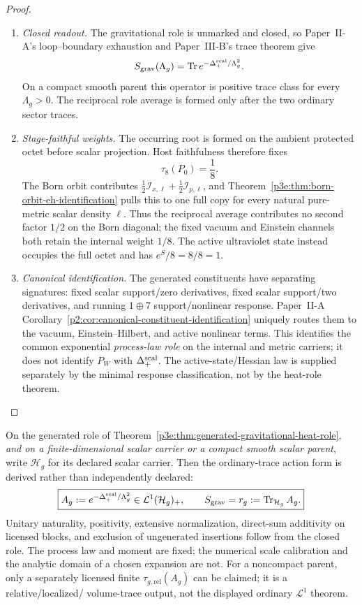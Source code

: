 \documentclass[12pt,a4paper]{article}
\begin{document}
\begin{proof}
\begin{enumerate}[label=\arabic*.,leftmargin=2.2em]
\item \emph{Closed readout.}
The gravitational role is unmarked and closed, so Paper~II-A's
loop--boundary exhaustion and Paper~III-B's trace theorem give
\[
 S_{\rm grav}(\Lambda_g)
 =\operatorname{Tr}e^{-\Delta_+^{\rm scal}/\Lambda_g^2}.
\]
On a compact smooth parent this operator is positive trace class for every
\(\Lambda_g>0\).  The reciprocal role average is formed only after the two
ordinary sector traces.

\item \emph{Stage-faithful weights.}
The occurring root is formed on the ambient protected octet before scalar
projection.  Host faithfulness therefore fixes
\[
 \tau_8(P_0)=\frac18.
\]
The Born orbit contributes
\(\tfrac12\mathcal I_{x,\ell}+\tfrac12\mathcal I_{p,\ell}\), and
Theorem~\ref{p3e:thm:born-orbit-eh-identification} pulls this to one full
copy for every natural pure-metric scalar density \(\ell\).  Thus the
reciprocal average contributes no second factor \(1/2\) on the Born diagonal;
the fixed vacuum and Einstein channels both retain the internal weight
\(1/8\).  The active ultraviolet state instead occupies the full octet and
has \(e^{S}/8=8/8=1\).

\item \emph{Canonical identification.}
The generated constituents have separating signatures:
fixed scalar support/zero derivatives, fixed scalar support/two derivatives,
and running \(1\oplus7\) support/nonlinear response.  Paper~II-A
Corollary~\ref{p2:cor:canonical-constituent-identification} uniquely routes
them to the vacuum, Einstein--Hilbert, and active nonlinear terms.  This
identifies the common exponential \emph{process-law role} on the internal and
metric carriers; it does not identify \(P_W\) with
\(\Delta_+^{\rm scal}\).  The active-state/Hessian law is supplied separately
by the minimal response classification, not by the heat-role theorem.
\end{enumerate}
\end{proof}

\begin{theorem}
\label{p3e:thm:general-closed-gravitational-readout}
On the generated role of
Theorem~\ref{p3e:thm:generated-gravitational-heat-role}, \emph{and on a
finite-dimensional scalar carrier or a compact smooth scalar parent}, write
$\mathcal H_g$ for its declared scalar carrier.  Then the ordinary-trace
action form is derived rather than independently declared:
\[
 \boxed{
 A_g:=e^{-\Delta_+^{\rm scal}/\Lambda_g^2}
 \in\mathcal L^1(\mathcal H_g)_+,
 \qquad
 S_{\rm grav}=r_g
 :=\operatorname{Tr}_{\mathcal H_g}A_g.}
\]
Unitary naturality, positivity, extensive normalization, direct-sum
additivity on licensed blocks, and exclusion of ungenerated insertions follow
from the closed role.  The process law and moment are fixed; the numerical
scale calibration and the analytic domain of a chosen expansion are not.
For a noncompact parent, only a separately licensed finite
$\tau_{g,\mathrm{rel}}(A_g)$ can be claimed; it is a relative/localized/
volume-trace output, not the displayed ordinary $\mathcal L^1$ theorem.
\end{theorem}
\end{document}
